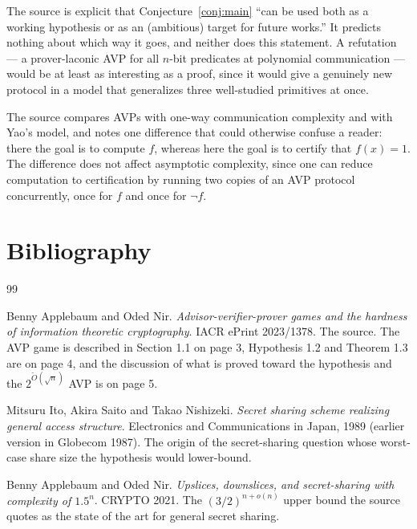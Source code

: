 \documentclass{aicr-conjecture}
\begin{document}
\begin{remark}\label{rem:framing}
The source is explicit that Conjecture~\ref{conj:main} ``can be used both
as a working hypothesis or as an (ambitious) target for future works.''
It predicts nothing about which way it goes, and neither does this
statement. A refutation --- a prover-laconic AVP for all $n$-bit predicates
at polynomial communication --- would be at least as interesting as a
proof, since it would give a genuinely new protocol in a model that
generalizes three well-studied primitives at once.
\end{remark}

\begin{remark}\label{rem:related}
The source compares AVPs with one-way communication complexity and with
Yao's model, and notes one difference that could otherwise confuse a
reader: there the goal is to compute $f$, whereas here the goal is to
certify that $f(x) = 1$. The difference does not affect asymptotic
complexity, since one can reduce computation to certification by running
two copies of an AVP protocol concurrently, once for $f$ and once for
$\neg f$.
\end{remark}

\section{Bibliography}

\begin{aicrbibliography}{99}

Benny Applebaum and Oded Nir.
\emph{Advisor-verifier-prover games and the hardness of information
theoretic cryptography}.
IACR ePrint 2023/1378.
The source. The AVP game is described in Section 1.1 on page 3,
Hypothesis 1.2 and Theorem 1.3 are on page 4, and the discussion of what
is proved toward the hypothesis and the $2^{\tilde{O}(\sqrt{n})}$ AVP is
on page 5.

Mitsuru Ito, Akira Saito and Takao Nishizeki.
\emph{Secret sharing scheme realizing general access structure}.
Electronics and Communications in Japan, 1989 (earlier version in
Globecom 1987).
The origin of the secret-sharing question whose worst-case share size the
hypothesis would lower-bound.

Benny Applebaum and Oded Nir.
\emph{Upslices, downslices, and secret-sharing with complexity of
$1.5^{n}$}.
CRYPTO 2021.
The $(3/2)^{n+o(n)}$ upper bound the source quotes as the state of the
art for general secret sharing.

\end{aicrbibliography}
\end{document}
